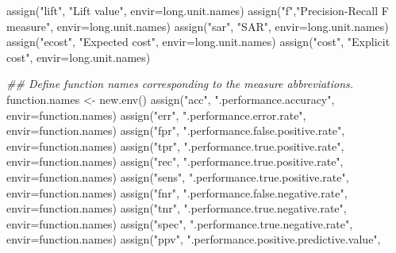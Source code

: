 \documentclass[
  letterpaper,
  DIV=11,
  numbers=noendperiod]{scrartcl}
\newenvironment{Shaded}{\begin{snugshade}}{\end{snugshade}}
\newcommand{\AttributeTok}[1]{\textcolor[rgb]{0.40,0.45,0.13}{#1}}
\newcommand{\DocumentationTok}[1]{\textcolor[rgb]{0.37,0.37,0.37}{\textit{#1}}}
\newcommand{\FunctionTok}[1]{\textcolor[rgb]{0.28,0.35,0.67}{#1}}
\newcommand{\NormalTok}[1]{\textcolor[rgb]{0.00,0.23,0.31}{#1}}
\newcommand{\OtherTok}[1]{\textcolor[rgb]{0.00,0.23,0.31}{#1}}
\newcommand{\StringTok}[1]{\textcolor[rgb]{0.13,0.47,0.30}{#1}}
\begin{document}
\begin{Shaded}
\begin{Highlighting}[]
    \FunctionTok{assign}\NormalTok{(}\StringTok{"lift"}\NormalTok{, }\StringTok{"Lift value"}\NormalTok{, }\AttributeTok{envir=}\NormalTok{long.unit.names)}
    \FunctionTok{assign}\NormalTok{(}\StringTok{"f"}\NormalTok{,}\StringTok{"Precision{-}Recall F measure"}\NormalTok{, }\AttributeTok{envir=}\NormalTok{long.unit.names)}
    \FunctionTok{assign}\NormalTok{(}\StringTok{"sar"}\NormalTok{, }\StringTok{"SAR"}\NormalTok{, }\AttributeTok{envir=}\NormalTok{long.unit.names)}
    \FunctionTok{assign}\NormalTok{(}\StringTok{"ecost"}\NormalTok{, }\StringTok{"Expected cost"}\NormalTok{, }\AttributeTok{envir=}\NormalTok{long.unit.names)}
    \FunctionTok{assign}\NormalTok{(}\StringTok{"cost"}\NormalTok{, }\StringTok{"Explicit cost"}\NormalTok{, }\AttributeTok{envir=}\NormalTok{long.unit.names)}

    \DocumentationTok{\#\# Define function names corresponding to the measure abbreviations.}
\NormalTok{    function.names }\OtherTok{\textless{}{-}} \FunctionTok{new.env}\NormalTok{()}
    \FunctionTok{assign}\NormalTok{(}\StringTok{"acc"}\NormalTok{, }\StringTok{".performance.accuracy"}\NormalTok{, }\AttributeTok{envir=}\NormalTok{function.names)}
    \FunctionTok{assign}\NormalTok{(}\StringTok{"err"}\NormalTok{, }\StringTok{".performance.error.rate"}\NormalTok{, }\AttributeTok{envir=}\NormalTok{function.names)}
    \FunctionTok{assign}\NormalTok{(}\StringTok{"fpr"}\NormalTok{, }\StringTok{".performance.false.positive.rate"}\NormalTok{, }\AttributeTok{envir=}\NormalTok{function.names)}
    \FunctionTok{assign}\NormalTok{(}\StringTok{"tpr"}\NormalTok{, }\StringTok{".performance.true.positive.rate"}\NormalTok{, }\AttributeTok{envir=}\NormalTok{function.names)}
    \FunctionTok{assign}\NormalTok{(}\StringTok{"rec"}\NormalTok{, }\StringTok{".performance.true.positive.rate"}\NormalTok{, }\AttributeTok{envir=}\NormalTok{function.names)}
    \FunctionTok{assign}\NormalTok{(}\StringTok{"sens"}\NormalTok{, }\StringTok{".performance.true.positive.rate"}\NormalTok{, }\AttributeTok{envir=}\NormalTok{function.names)}
    \FunctionTok{assign}\NormalTok{(}\StringTok{"fnr"}\NormalTok{, }\StringTok{".performance.false.negative.rate"}\NormalTok{, }\AttributeTok{envir=}\NormalTok{function.names)}
    \FunctionTok{assign}\NormalTok{(}\StringTok{"tnr"}\NormalTok{, }\StringTok{".performance.true.negative.rate"}\NormalTok{, }\AttributeTok{envir=}\NormalTok{function.names)}
    \FunctionTok{assign}\NormalTok{(}\StringTok{"spec"}\NormalTok{, }\StringTok{".performance.true.negative.rate"}\NormalTok{, }\AttributeTok{envir=}\NormalTok{function.names)}
    \FunctionTok{assign}\NormalTok{(}\StringTok{"ppv"}\NormalTok{, }\StringTok{".performance.positive.predictive.value"}\NormalTok{,}

\end{Highlighting}
\end{Shaded}
\end{document}
